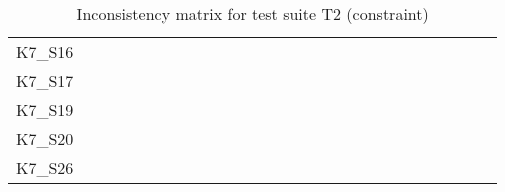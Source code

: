 \begin{table}[htpb]
\begin{tabular}{l|rrrrrrrrrrrrrrrrrrrrrrrrrr}
        K7\_S16 & \n & \n & \n & \e & \n & \n & \n & \n & \n & \n & \n & \n & \n & \n & \n & \n & \n & \n & \n & \n & \n & \n & \n & \n & \n & \n \\
        K7\_S17 & \n & \n & \n & \n & \n & \n & \n & \n & \e & \n & \n & \n & \n & \n & \n & \n & \n & \n & \n & \e & \e & \n & \e & \n & \n & \n \\
        K7\_S19 & \n & \n & \n & \n & \n & \n & \n & \n & \n & \n & \n & \n & \n & \n & \n & \n & \n & \n & \n & \n & \n & \n & \n & \n & \n & \n \\
        K7\_S20 & \n & \n & \n & \n & \n & \n & \n & \n & \n & \n & \n & \n & \n & \n & \n & \n & \n & \n & \n & \n & \n & \n & \n & \n & \n & \n \\
        K7\_S26 & \n & \n & \n & \n & \n & \n & \n & \n & \n & \n & \n & \n & \n & \n & \n & \n & \n & \n & \n & \n & \n & \n & \n & \n & \n & \n \\
        \bottomrule
    \end{tabular}
    \caption{Inconsistency matrix for test suite T2 (constraint)}
    \label{tab:inconsistencies_matrix_constraint}
    \setlength{\tabcolsep}{\defaulttabcolsep}
\end{table}

